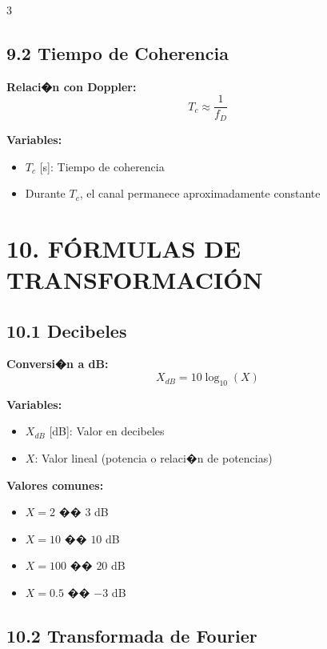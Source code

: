 ﻿\documentclass[8pt,a4paper]{article}
\begin{document}
\begin{multicols}{3}
\vspace{-2mm}
\subsection*{\small 9.2 Tiempo de Coherencia}
\vspace{-2mm}

\textbf{Relaci�n con Doppler:}
\[
T_c \approx \frac{1}{f_D}
\]

\textbf{Variables:}
\begin{itemize}[leftmargin=*,itemsep=0pt]
    \item $T_c$ [s]: Tiempo de coherencia
    \item Durante $T_c$, el canal permanece aproximadamente constante
\end{itemize}

\vspace{-2mm}
\section*{\color{sectioncolor}\normalsize 10. FÓRMULAS DE TRANSFORMACIÓN}
\vspace{-3mm}

\subsection*{\small 10.1 Decibeles}
\vspace{-2mm}

\textbf{Conversi�n a dB:}
\[
X_{dB} = 10 \log_{10}(X)
\]

\textbf{Variables:}
\begin{itemize}[leftmargin=*,itemsep=0pt]
    \item $X_{dB}$ [dB]: Valor en decibeles
    \item $X$: Valor lineal (potencia o relaci�n de potencias)
\end{itemize}

\textbf{Valores comunes:}
\begin{itemize}[leftmargin=*,itemsep=0pt]
    \item $X = 2$ �� $3$ dB
    \item $X = 10$ �� $10$ dB
    \item $X = 100$ �� $20$ dB
    \item $X = 0.5$ �� $-3$ dB
\end{itemize}

\vspace{-2mm}
\subsection*{\small 10.2 Transformada de Fourier}
\vspace{-2mm}


\end{multicols}
\end{document}
